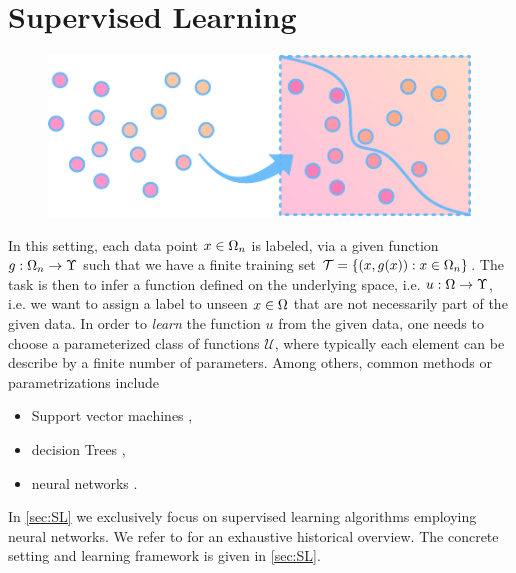 \section{Supervised Learning}
\begin{figure}
\centering
\includegraphics[width=.5\textwidth]{atelier/paradigms/SL.pdf}
\end{figure}
%
In this setting, each data point $x\in\Omega_n$ is labeled, via a given function $g:\Omega_n\to\Upsilon$ such that we have a finite training set $\mathcal{T} = \{(x,g(x)): x\in\Omega_n\}$. The task is then to infer a function defined on the underlying space, i.e. $u:\Omega \to\Upsilon$, i.e. we want to assign a label to unseen $x\in\Omega$ that are not necessarily part of the given data. In order to \emph{learn} the function $u$ from the given data, one needs to choose a parameterized class of functions $\mathcal{U}$, where typically each element can be describe by a finite number of parameters. Among others, common methods or parametrizations include
%
\begin{itemize}
\item Support vector machines \cite{cortes1995support, scholkopf2005support},
\item decision Trees \cite{morgan1963problems, Brei},
\item neural networks \cite{Turing,rosenblatt1958perceptron, minsky1969introduction}.
\end{itemize}
%
In \cref{sec:SL} we exclusively focus on supervised learning algorithms employing neural networks. We refer to \cite{SCHMIDHUBER201585} for an exhaustive historical overview. The concrete setting and learning framework is given in \cref{sec:SL}.
%
%
%
